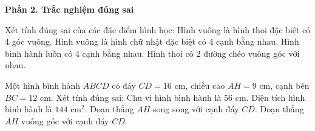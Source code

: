 \textbf{Phần 2. Trắc nghiệm đúng sai}

\begin{ex} %
Xét tính đúng sai của các đặc điểm hình học:
\choiceTF
{\True Hình vuông là hình thoi đặc biệt có 4 góc vuông.}
{\True Hình vuông là hình chữ nhật đặc biệt có 4 cạnh bằng nhau.}
{Hình bình hành luôn có 4 cạnh bằng nhau.}
{\True Hình thoi có 2 đường chéo vuông góc với nhau.}
\end{ex}

\begin{ex} %
Một hình bình hành $ABCD$ có đáy $CD = 16\text{ cm}$, chiều cao $AH = 9\text{ cm}$, cạnh bên $BC = 12\text{ cm}$. Xét tính đúng sai:
\choiceTF
{\True Chu vi hình bình hành là $56\text{ cm}$.}
{\True Diện tích hình bình hành là $144\text{ cm}^2$.}
{Đoạn thẳng $AH$ song song với cạnh đáy $CD$.}
{\True Đoạn thẳng $AH$ vuông góc với cạnh đáy $CD$.}
\end{ex}

